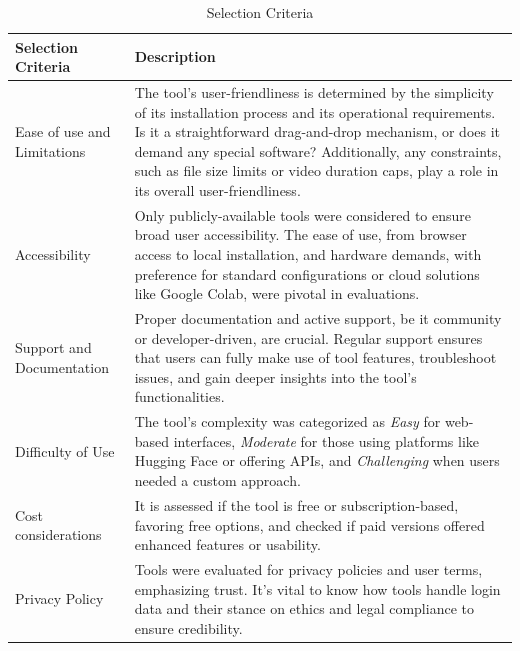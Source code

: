 \begin{table}[htpb]
	\caption{Selection Criteria}\label{tab:selection_criteria}
	\centering
	\small
	\begin{tabularx}{\textwidth}{l X}
		\toprule
		\textbf{Selection Criteria} & \textbf{Description}                                      \\
		\midrule
		Ease of use and Limitations & The tool's user-friendliness is determined
		by the simplicity of its installation process and its operational
		requirements. Is it a straightforward drag-and-drop mechanism, or does
		it demand any special software? Additionally, any constraints, such
		as file size limits or video duration caps, play a role in its overall
		user-friendliness.                                                                      \\
		\addlinespace
		Accessibility               & Only publicly-available tools were considered
		to ensure broad user accessibility. The ease of use, from browser access
		to local installation, and hardware demands, with preference for
		standard configurations or cloud solutions like Google Colab,
		were pivotal in evaluations.                                                            \\
		\addlinespace
		Support and Documentation   & Proper documentation and active support,
		be it community or developer-driven, are crucial. Regular support
		ensures that users can fully make use of tool features, troubleshoot issues,
		and gain deeper insights into the tool's functionalities.                               \\
		\addlinespace
		Difficulty of Use           & The tool's complexity was categorized as
		\textit{Easy} for web-based interfaces, \textit{Moderate} for those using
		platforms like Hugging Face or offering \ac{API}s, and \textit{Challenging}
		when users needed a custom approach.                                                    \\
		\addlinespace
		Cost considerations         & It is assessed if the tool is free or
		subscription-based, favoring free options, and checked if paid versions
		offered enhanced features or usability.                                                 \\
		\addlinespace
		Privacy Policy              & Tools were evaluated for privacy policies and user terms,
		emphasizing trust. It's vital to know how tools handle login data and their
		stance on ethics and legal compliance to ensure credibility.                            \\
		\bottomrule
	\end{tabularx}
\end{table}

